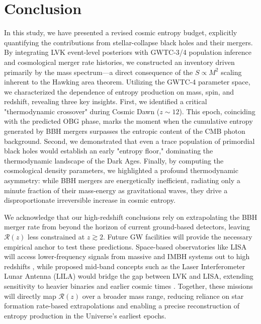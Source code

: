 \documentclass[twocolumn]{aastex631}
\begin{document}
\section{Conclusion}
In this study, we have presented a revised cosmic entropy budget, explicitly quantifying the contributions from stellar-collapse black holes and their mergers. By integrating LVK event-level posteriors with GWTC-3/4 population inference and cosmological merger rate histories, we constructed an inventory driven primarily by the mass spectrum—a direct consequence of the $S \propto M^2$ scaling inherent to the Hawking area theorem. Utilizing the GWTC-4 parameter space, we characterized the dependence of entropy production on mass, spin, and redshift, revealing three key insights. First, we identified a critical "thermodynamic crossover" during Cosmic Dawn ($z \sim 12$). This epoch, coinciding with the predicted OBG phase, marks the moment when the cumulative entropy generated by BBH mergers surpasses the entropic content of the CMB photon background. Second, we demonstrated that even a trace population of primordial black holes would establish an early "entropy floor," dominating the thermodynamic landscape of the Dark Ages. Finally, by computing the cosmological density parameters, we highlighted a profound thermodynamic asymmetry: while BBH mergers are energetically inefficient, radiating only a minute fraction of their mass-energy as gravitational waves, they drive a disproportionate irreversible increase in cosmic entropy.

We acknowledge that our high-redshift conclusions rely on extrapolating the BBH merger rate from \cite{Mapelli_2018} beyond the horizon of current ground-based detectors, leaving $\mathcal{R}(z)$ less constrained at $z\gtrsim2$. Future GW facilities will provide the necessary empirical anchor to test these predictions. Space-based observatories like LISA~\cite{LISAstudyreport} will access lower-frequency signals from massive and IMBH systems out to high redshifts \citep{Rosado_2016, Ng_2022, Mancarella_2023, Wu_2024}, while proposed mid-band concepts such as the Laser Interferometer Lunar Antenna (LILA) would bridge the gap between LVK and LISA, extending sensitivity to heavier binaries and earlier cosmic times \citep{jani_2021, jani2025laserinterferometerlunarantenna, LILAPioneer, LILAHorizon}. Together, these missions will directly map $\mathcal{R}(z)$ over a broader mass range, reducing reliance on star formation rate-based extrapolations and enabling a precise reconstruction of entropy production in the Universe's earliest epochs.
\end{document}
